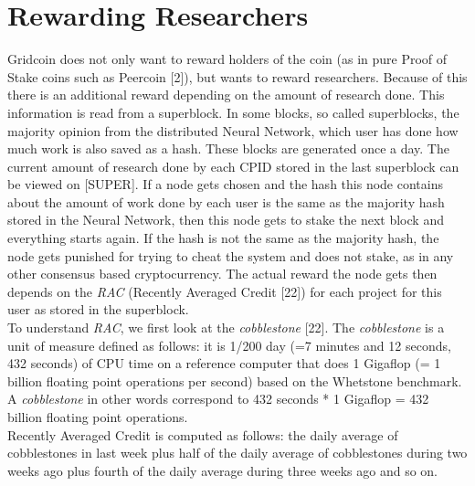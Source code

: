 \section{Rewarding Researchers}

Gridcoin does not only want to reward holders of the coin (as in pure Proof of Stake coins such as Peercoin [2]), but wants to reward researchers. Because of this there is an additional reward depending on the amount of research done. This information is read from a superblock. In some blocks, so called superblocks, the majority opinion from the distributed Neural Network, which user has done how much work is also saved as a hash. These blocks are generated once a day. The current amount of research done by each CPID stored in the last superblock can be viewed on [SUPER]. If a node gets chosen and the hash this node contains about the amount of work done by each user is the same as the majority hash stored in the Neural Network, then this node gets to stake the next block and everything starts again. If the hash is not the same as the majority hash, the node gets punished for trying to cheat the system and does not stake, as in any other consensus based cryptocurrency. The actual reward the node gets then depends on the \textit{RAC} (Recently Averaged Credit [22]) for each project for this user as stored in the superblock.\\

To understand \textit{RAC}, we first look at the \textit{cobblestone} [22]. The \textit{cobblestone} is a unit of measure defined as follows: it is 1/200 day (=7 minutes and 12 seconds, 432 seconds) of CPU time on a reference computer that does 1 Gigaflop (= 1 billion floating point operations per second) based on the Whetstone benchmark. A \textit{cobblestone} in other words correspond to 432 seconds * 1 Gigaflop = 432 billion floating point operations.\\

Recently Averaged Credit is computed as follows: the daily average of cobblestones in last week plus half of the daily average of cobblestones during two weeks ago plus fourth of the daily average during three weeks ago and so on.\\ 

